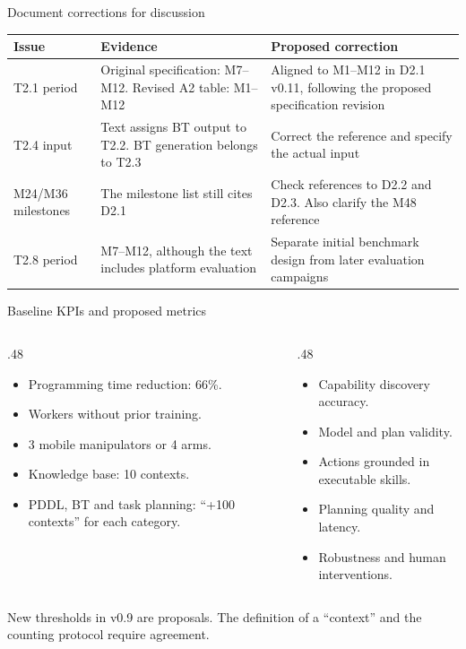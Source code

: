 \documentclass[aspectratio=169,10pt]{beamer}
\begin{document}
\begin{frame}{Document corrections for discussion}
\small\renewcommand{\arraystretch}{1.35}
\begin{tabularx}{\textwidth}{@{}p{}XX@{}}
\toprule
Issue & Evidence & Proposed correction\\\midrule
T2.1 period & Original specification: M7--M12. Revised A2 table: M1--M12 & Aligned to M1--M12 in D2.1 v0.11, following the proposed specification revision\\
T2.4 input & Text assigns BT output to T2.2. BT generation belongs to T2.3 & Correct the reference and specify the actual input\\
M24/M36 milestones & The milestone list still cites D2.1 & Check references to D2.2 and D2.3. Also clarify the M48 reference\\
T2.8 period & M7--M12, although the text includes platform evaluation & Separate initial benchmark design from later evaluation campaigns\\\bottomrule
\end{tabularx}
\end{frame}

\begin{frame}{Baseline KPIs and proposed metrics}
\begin{columns}[T]
\begin{column}{.48\textwidth}
\begin{itemize}\items
\item Programming time reduction: 66\%.
\item Workers without prior training.
\item 3 mobile manipulators or 4 arms.
\item Knowledge base: 10 contexts.
\item PDDL, BT and task planning: ``+100 contexts'' for each category.
\end{itemize}
\end{column}
\begin{column}{.48\textwidth}
\begin{itemize}\items
\item Capability discovery accuracy.
\item Model and plan validity.
\item Actions grounded in executable skills.
\item Planning quality and latency.
\item Robustness and human interventions.
\end{itemize}
\end{column}
\end{columns}
\medskip\small New thresholds in v0.9 are proposals. The definition of a ``context'' and the counting protocol require agreement.
\end{frame}
\end{document}
